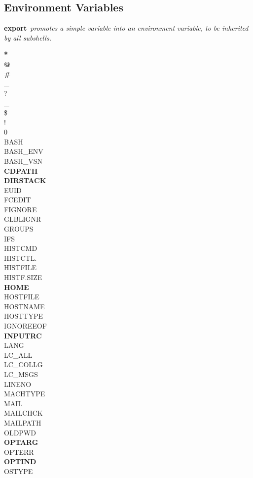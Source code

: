 \subsection*{Environment Variables}
{\bf export}{\it\ promotes a simple variable into an environment variable, to be inherited by all subshells.}
\vspace{-3mm}
{\footnotesize \begin{multicols*}{4}
    \textbf{*} \\    \textbf{@} \\    \textbf{\#} \\   \_ \\   ? \\    \_ \\   \$ \\   ! \\
    0 \\    BASH \\ BASH\_ENV \\    BASH\_VS\textquotesingle N \\    \textbf{CDPATH} \\   
    \textbf{DIRSTACK} \\     EUID \\     FCEDIT \\   FIGNORE \\  GL\textquotesingle BLIGN\textquotesingle R \\
    GROUPS \\   IFS \\  HISTCMD \\  HISTCTL. \\  HISTFILE \\
    HISTF.SIZE \\   \textbf{HOME} \\     HOSTFILE \\     HOSTNAME \\ HOSTTYPE \\
    IGNOREEOF \\    \textbf{INPUTRC} \\  LANG \\ LC\_ALL \\  LC\_COLL\textquotesingle G \\
    LC\_M\textquotesingle SGS \\ LINENO \\   MACHTYPE \\ MAIL \\ MAILCH\textquotesingle CK \\    
    MAILPATH \\ OLDPWD \\  \textbf{OPTARG} \\   OPTERR \\   \textbf{OPTIND} \\   OSTYPE \\

\end{multicols*}}
